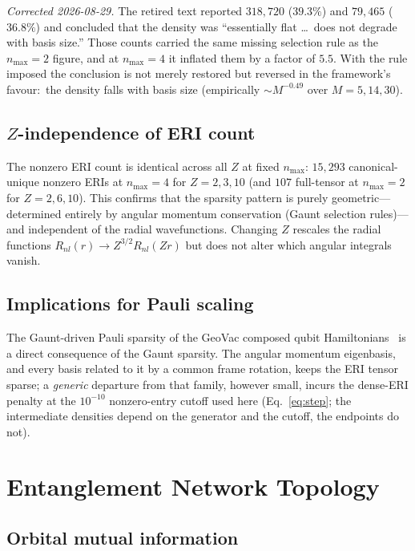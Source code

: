 \documentclass[twocolumn,pra,amsmath,amssymb,superscriptaddress]{revtex4-2}
\begin{document}
\emph{Corrected 2026-08-29.}  The retired text reported $318{,}720$
($39.3\%$) and $79{,}465$ ($36.8\%$) and concluded that the density
was ``essentially flat \dots\ does not degrade with basis size.''
Those counts carried the same missing selection rule as the
$n_{\max} = 2$ figure, and at $n_{\max} = 4$ it inflated them by a
factor of $5.5$.  With the rule imposed the conclusion is not merely
restored but reversed in the framework's favour:\ the density falls
with basis size (empirically $\sim\!M^{-0.49}$ over $M = 5, 14, 30$).

\subsection{$Z$-independence of ERI count}

The nonzero ERI count is identical across all $Z$ at fixed
$n_{\max}$: $15{,}293$ canonical-unique nonzero ERIs at
$n_{\max} = 4$ for $Z = 2, 3, 10$ (and $107$ full-tensor at
$n_{\max} = 2$ for $Z = 2, 6, 10$).  This confirms that the sparsity
pattern is purely geometric---determined entirely by angular momentum
conservation (Gaunt selection rules)---and independent of the
radial wavefunctions.  Changing $Z$ rescales the radial functions
$R_{nl}(r) \to Z^{3/2} R_{nl}(Zr)$ but does not alter which
angular integrals vanish.

\subsection{Implications for Pauli scaling}

The Gaunt-driven Pauli sparsity of the GeoVac composed qubit
Hamiltonians~\cite{GeoVac_Paper14} is a direct consequence of
the Gaunt sparsity.  The angular momentum eigenbasis, and every
basis related to it by a common frame rotation, keeps the ERI tensor
sparse; a \emph{generic} departure from that family, however small,
incurs the dense-ERI penalty at the $10^{-10}$ nonzero-entry cutoff
used here (Eq.~\ref{eq:step}; the intermediate densities depend on the
generator and the cutoff, the endpoints do not).

\section{Entanglement Network Topology}
\label{sec:network}

\subsection{Orbital mutual information}
\end{document}
